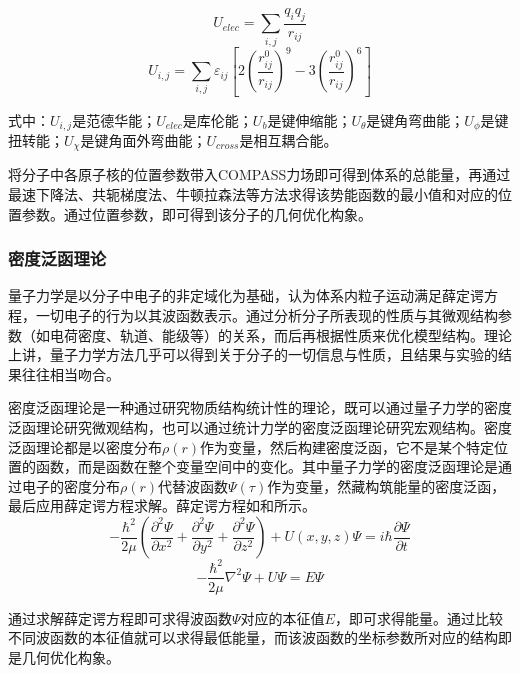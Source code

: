 \begin{equation}
    U_{elec}=\sum_{i, j} \frac{q_{i} q_{j}}{r_{i j}}
\end{equation}
\begin{equation}
    U_{i, j}=\sum_{i, j} \varepsilon_{ij}\left[2\left(\frac{r_{i j}^{0}}{r_{i j}}\right)^{9}-3\left(\frac{r_{i j}^{0}}{r_{i j}}\right)^{6}\right]
\end{equation}

\par{式中：$U_{i, j}$是范德华能；$U_{elec}$是库伦能；$U_{b}$是键伸缩能；$U_{\theta}$是键角弯曲能；$U_{\phi}$是键扭转能；$U_{\chi}$是键角面外弯曲能；$U_{cross}$是相互耦合能。}
\par{将分子中各原子核的位置参数带入COMPASS力场即可得到体系的总能量，再通过最速下降法、共轭梯度法、牛顿拉森法等方法求得该势能函数的最小值和对应的位置参数。通过位置参数，即可得到该分子的几何优化构象。}
\subsubsection{密度泛函理论}
\par{量子力学是以分子中电子的非定域化为基础，认为体系内粒子运动满足薛定谔方程，一切电子的行为以其波函数表示。通过分析分子所表现的性质与其微观结构参数（如电荷密度、轨道、能级等）的关系，而后再根据性质来优化模型结构。理论上讲，量子力学方法几乎可以得到关于分子的一切信息与性质，且结果与实验的结果往往相当吻合。}
\par{密度泛函理论是一种通过研究物质结构统计性的理论，既可以通过量子力学的密度泛函理论研究微观结构，也可以通过统计力学的密度泛函理论研究宏观结构。密度泛函理论都是以密度分布$\rho(r)$作为变量，然后构建密度泛函，它不是某个特定位置的函数，而是函数在整个变量空间中的变化。其中量子力学的密度泛函理论是通过电子的密度分布$\rho(r)$代替波函数$\Psi(\tau)$作为变量，然藏构筑能量的密度泛函，最后应用薛定谔方程求解\cite{密度泛函理论}。薛定谔方程如和所示。}
\begin{equation}\label{xue1}
    -\frac{\hbar^{2}}{2 \mu}\left(\frac{\partial^{2} \Psi}{\partial x^{2}}+\frac{\partial^{2} \Psi}{\partial y^{2}}+\frac{\partial^{2} \Psi}{\partial z^{2}}\right)+U(x, y, z) \Psi=i \hbar \frac{\partial \Psi}{\partial t}
\end{equation}
\begin{equation}\label{xue2}
    -\frac{\hbar^{2}}{2 \mu} \nabla^{2} \Psi+U \Psi=E \Psi
\end{equation}
\par{通过求解薛定谔方程即可求得波函数$\Psi$对应的本征值$E$，即可求得能量。通过比较不同波函数的本征值就可以求得最低能量，而该波函数的坐标参数所对应的结构即是几何优化构象。}
